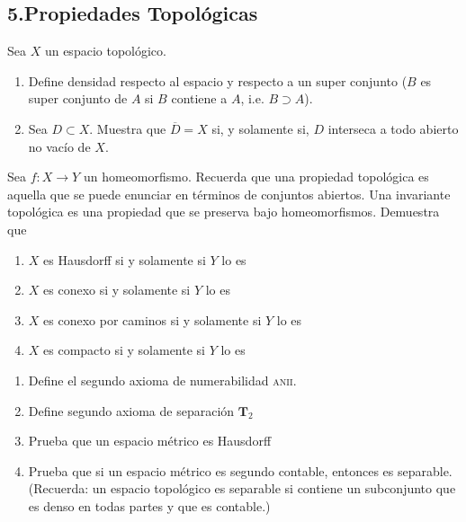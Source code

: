 \documentclass[b5paper,10pt,twoside]{book}
\begin{document}




\subsection*{5.\enspace Propiedades Topológicas }

\begin{problem}
Sea \(X\)  un espacio topológico.
\begin{enumerate}[label=(\roman*)]
\item Define densidad respecto al espacio y respecto a un super conjunto (\(B\) es super conjunto de \(A\) si \(B\) contiene a \(A\), i.e. \(B\supset A\)).
\item Sea   \(D\subset X\). Muestra que \(\overline{D} = X\) si, y solamente si, \(D\) interseca a todo abierto no vacío de \(X\).
\end{enumerate}



\end{problem}

\begin{problem}
Sea \(f\colon X\to Y\)
un homeomorfismo.
Recuerda que una propiedad topológica es aquella que se puede enunciar en términos de 
conjuntos abiertos.
Una invariante topológica 
es una propiedad que se preserva bajo homeomorfismos.
Demuestra que 
\begin{enumerate}[label=(\roman*)]
\item  \(X\) es Hausdorff si y solamente si  \(Y\) lo es
\item  \(X\) es conexo si y solamente si  \(Y\) lo es
\item  \(X\) es conexo por caminos si y solamente si  \(Y\) lo es
\item  \(X\) es compacto si y solamente si  \(Y\) lo es
\end{enumerate}
\end{problem}

\pagebreak

\begin{problem}\hfill
\begin{enumerate}[label=(\roman*)]
\item Define  el segundo  axioma de numerabilidad  {\scshape anii}.
\item Define segundo  axioma de separación \(\mathbf{T}_2\)
\item Prueba que un espacio métrico es  Hausdorff
\item Prueba que si un espacio métrico es segundo contable, entonces es separable. (Recuerda: un espacio topológico es separable si contiene un subconjunto que es denso en todas partes y que es contable.)
\end{enumerate}

\end{problem}
\end{document}
